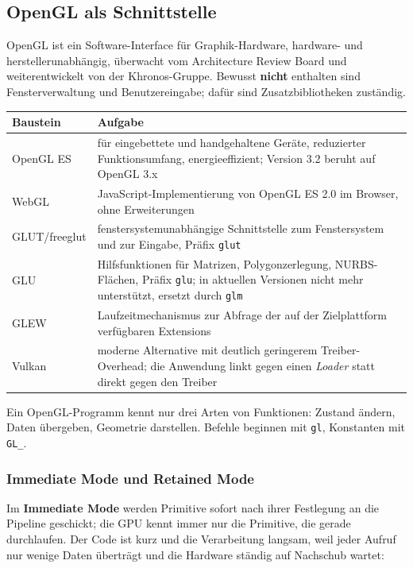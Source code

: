 \documentclass[12pt, a4paper]{article}
\begin{document}
\subsection{OpenGL als Schnittstelle}

OpenGL ist ein Software-Interface für Graphik-Hardware, hardware- und
herstellerunabhängig, überwacht vom Architecture Review Board und weiterentwickelt von
der Khronos-Gruppe. Bewusst \textbf{nicht} enthalten sind Fensterverwaltung und
Benutzereingabe; dafür sind Zusatzbibliotheken zuständig.

\begin{center}
\begin{tabular}{@{}p{2.4cm}p{10.8cm}@{}}
\toprule
\textbf{Baustein} & \textbf{Aufgabe} \\
\midrule
OpenGL ES & für eingebettete und handgehaltene Geräte, reduzierter Funktionsumfang, energieeffizient; Version 3.2 beruht auf OpenGL 3.x \\
WebGL & JavaScript-Implementierung von OpenGL ES 2.0 im Browser, ohne Erweiterungen \\
GLUT/freeglut & fenstersystemunabhängige Schnittstelle zum Fenstersystem und zur Eingabe, Präfix \texttt{glut} \\
GLU & Hilfsfunktionen für Matrizen, Polygonzerlegung, NURBS-Flächen, Präfix \texttt{glu}; in aktuellen Versionen nicht mehr unterstützt, ersetzt durch \texttt{glm} \\
GLEW & Laufzeitmechanismus zur Abfrage der auf der Zielplattform verfügbaren Extensions \\
Vulkan & moderne Alternative mit deutlich geringerem Treiber-Overhead; die Anwendung linkt gegen einen \textit{Loader} statt direkt gegen den Treiber \\
\bottomrule
\end{tabular}
\end{center}

Ein OpenGL-Programm kennt nur drei Arten von Funktionen: Zustand ändern, Daten
übergeben, Geometrie darstellen. Befehle beginnen mit \texttt{gl}, Konstanten mit
\texttt{GL\_}.

\subsubsection*{Immediate Mode und Retained Mode}

Im \textbf{Immediate Mode} werden Primitive sofort nach ihrer Festlegung an die Pipeline
geschickt; die GPU kennt immer nur die Primitive, die gerade durchlaufen. Der Code ist
kurz und die Verarbeitung langsam, weil jeder Aufruf nur wenige Daten überträgt und die
Hardware ständig auf Nachschub wartet:
\end{document}
